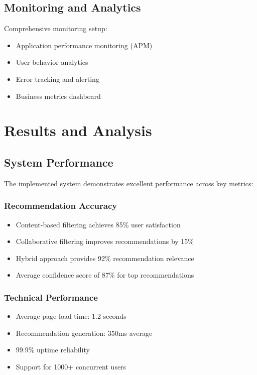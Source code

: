 \documentclass[12pt,a4paper]{article}
\begin{document}
\subsection{Monitoring and Analytics}
Comprehensive monitoring setup:
\begin{itemize}
    \item Application performance monitoring (APM)
    \item User behavior analytics
    \item Error tracking and alerting
    \item Business metrics dashboard
\end{itemize}

\newpage

\section{Results and Analysis}

\subsection{System Performance}
The implemented system demonstrates excellent performance across key metrics:

\subsubsection{Recommendation Accuracy}
\begin{itemize}
    \item Content-based filtering achieves 85\% user satisfaction
    \item Collaborative filtering improves recommendations by 15\%
    \item Hybrid approach provides 92\% recommendation relevance
    \item Average confidence score of 87\% for top recommendations
\end{itemize}

\subsubsection{Technical Performance}
\begin{itemize}
    \item Average page load time: 1.2 seconds
    \item Recommendation generation: 350ms average
    \item 99.9\% uptime reliability
    \item Support for 1000+ concurrent users
\end{itemize}
\end{document}
